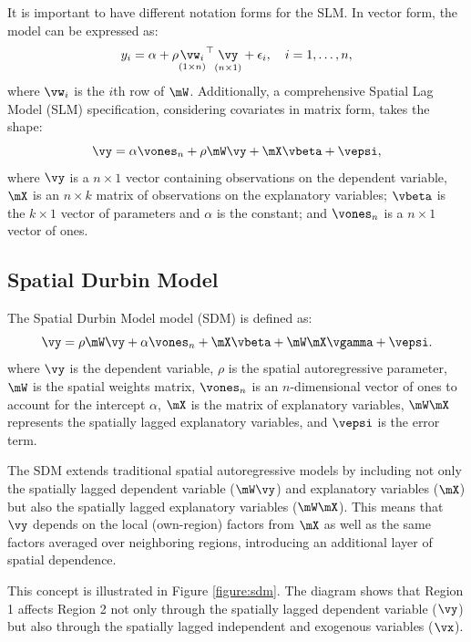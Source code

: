 \documentclass[english,12pt]{book}\usepackage[]{graphicx}\usepackage[]{xcolor}
\begin{document}
It is important to have different notation forms for the SLM. In vector form, the model can be expressed as:
\begin{equation*}
y_i = \alpha + \rho \underset{(1\times n)}{\vw_i}^\top \underset{(n\times 1)}{\vy} + \epsilon_i, \quad i = 1,\ldots,n,
\end{equation*}
%
where $\vw_i$ is the $i$th row of $\mW$. Additionally, a comprehensive Spatial Lag Model (SLM) specification, considering covariates in matrix form, takes the shape:
\begin{equation}\label{eq:Sar}
\vy  =  \alpha \vones_n+ \rho \mW\vy + \mX\vbeta + \vepsi,
\end{equation}
%
where $\vy$ is a $n\times 1$ vector containing observations on the dependent variable, $\mX$ is an $n\times k$ matrix of observations on the explanatory variables; $\vbeta$ is the $k\times 1$ vector of parameters and $\alpha$ is the constant; and $\vones_n$ is a $n\times 1$ vector of ones.

\subsection{Spatial Durbin Model}

The Spatial Durbin Model model (SDM) is defined as:
\begin{equation}\label{eq:Sdm}
\vy  =  \rho \mW\vy + \alpha \vones_n + \mX\vbeta + \mW\mX\vgamma + \vepsi.
\end{equation}
%
where $\vy$ is the dependent variable, $\rho$ is the spatial autoregressive parameter, $\mW$ is the spatial weights matrix, $\vones_n$ is an $n$-dimensional vector of ones to account for the intercept $\alpha$, $\mX$ is the matrix of explanatory variables, $\mW\mX$ represents the spatially lagged explanatory variables, and $\vepsi$ is the error term.

The SDM extends traditional spatial autoregressive models by including not only the spatially lagged dependent variable ($\mW\vy$) and explanatory variables ($\mX$) but also the spatially lagged explanatory variables ($\mW\mX$). This means that $\vy$ depends on the local (own-region) factors from $\mX$ as well as the same factors averaged over neighboring regions, introducing an additional layer of spatial dependence.

This concept is illustrated in Figure \ref{figure:sdm}. The diagram shows that Region 1 affects Region 2 not only through the spatially lagged dependent variable ($\vy$) but also through the spatially lagged independent and exogenous variables ($\vx$).
\end{document}

